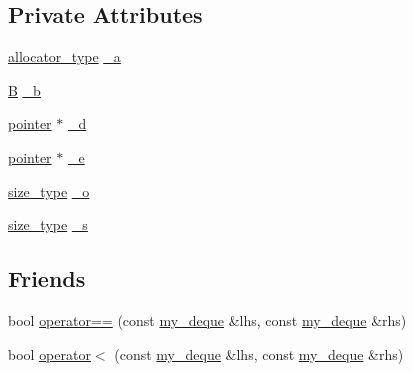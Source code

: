 \subsection*{Private Attributes}
\begin{DoxyCompactItemize}
\item 
\hyperlink{classmy__deque_a34236f0fef930decd11dc683f40a38be}{allocator\-\_\-type} \hyperlink{classmy__deque_ab2ba2e14114a27b2f91e47dfccabc639}{\-\_\-a}
\item 
\hyperlink{classmy__deque_a1a55c016646bba79086d90d3cccde143}{B} \hyperlink{classmy__deque_a365667310d1858fdfbb4d4e95a98fdf6}{\-\_\-b}
\item 
\hyperlink{classmy__deque_a58e82fc365a3b086367479515e1515be}{pointer} $\ast$ \hyperlink{classmy__deque_a4dcfc8cca4d49800ae5dfec5d5dfec6c}{\-\_\-d}
\item 
\hyperlink{classmy__deque_a58e82fc365a3b086367479515e1515be}{pointer} $\ast$ \hyperlink{classmy__deque_aa2382314564214ae5f83365c22bbf43d}{\-\_\-e}
\item 
\hyperlink{classmy__deque_a61e5e5317fe72a381ce4d45f09544b02}{size\-\_\-type} \hyperlink{classmy__deque_ab2ba6a60c6e86c24a5be656bd7a9dd2b}{\-\_\-o}
\item 
\hyperlink{classmy__deque_a61e5e5317fe72a381ce4d45f09544b02}{size\-\_\-type} \hyperlink{classmy__deque_a11ca00aa25c54192740f188bdf8a3858}{\-\_\-s}
\end{DoxyCompactItemize}
\subsection*{Friends}
\begin{DoxyCompactItemize}
\item 
bool \hyperlink{classmy__deque_aca1e37552707f9d7710a6af82cf1262e}{operator==} (const \hyperlink{classmy__deque}{my\-\_\-deque} \&lhs, const \hyperlink{classmy__deque}{my\-\_\-deque} \&rhs)
\item 
bool \hyperlink{classmy__deque_abd32df1d76a0ab0c1519f65cc4fa1363}{operator$<$} (const \hyperlink{classmy__deque}{my\-\_\-deque} \&lhs, const \hyperlink{classmy__deque}{my\-\_\-deque} \&rhs)
\end{DoxyCompactItemize}


